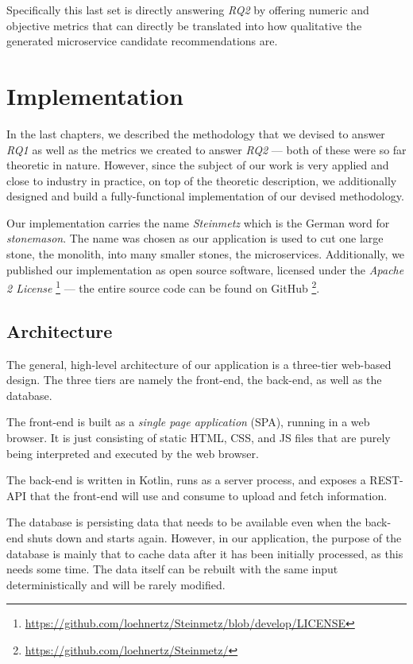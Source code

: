 \documentclass[12pt,a4paper]{report}
\begin{document}
Specifically this last set is directly answering \textit{RQ2} by offering
numeric and objective metrics that can directly be translated into how
qualitative the generated microservice candidate recommendations are.




\chapter{Implementation} \label{chap:implementation}

In the last chapters, we described the methodology that we devised to answer
\textit{RQ1} as well as the metrics we created to answer \textit{RQ2} ---
both of these were so far theoretic in nature.
However, since the subject of our work is very applied and close to industry
in practice, on top of the theoretic description, we additionally designed
and build a fully-functional implementation of our devised methodology.

Our implementation carries the name \textit{Steinmetz} which is the German
word for \textit{stonemason}. The name was chosen as our application is used
to cut one large stone, the monolith, into many smaller stones, the microservices.
Additionally, we published our implementation as open source software,
licensed under the \textit{Apache 2 License}
\footnote{\url{https://github.com/loehnertz/Steinmetz/blob/develop/LICENSE}} ---
the entire source code can be found on GitHub
\footnote{\url{https://github.com/loehnertz/Steinmetz/}}.



\section{Architecture}
The general, high-level architecture of our application is a three-tier
web-based design. The three tiers are namely the front-end, the back-end,
as well as the database.

The front-end is built as a \textit{single page application} (SPA),
running in a web browser. It is just consisting of static HTML, CSS, and JS files
that are purely being interpreted and executed by the web browser.

The back-end is written in Kotlin, runs as a server process, and exposes
a REST-API that the front-end will use and consume to upload and fetch information.

The database is persisting data that needs to be available even when the
back-end shuts down and starts again. However, in our application,
the purpose of the database is mainly that to cache data after it has
been initially processed, as this needs some time. The data itself can be
rebuilt with the same input deterministically and will be rarely modified.
\end{document}
